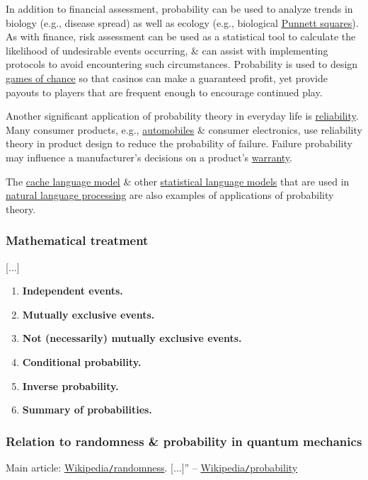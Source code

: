 \documentclass{article}
\begin{document}
In addition to financial assessment, probability can be used to analyze trends in biology (e.g., disease spread) as well as ecology (e.g., biological \href{https://en.wikipedia.org/wiki/Punnett_squares}{Punnett squares}). As with finance, risk assessment can be used as a statistical tool to calculate the likelihood of undesirable events occurring, \& can assist with implementing protocols to avoid encountering such circumstances. Probability is used to design \href{https://en.wikipedia.org/wiki/Games_of_chance}{games of chance} so that casinos can make a guaranteed profit, yet provide payouts to players that are frequent enough to encourage continued play.

Another significant application of probability theory in everyday life is \href{https://en.wikipedia.org/wiki/Reliability_(statistics)}{reliability}. Many consumer products, e.g., \href{https://en.wikipedia.org/wiki/Automobiles}{automobiles} \& consumer electronics, use reliability theory in product design to reduce the probability of failure. Failure probability may influence a manufacturer's decisions on a product's \href{https://en.wikipedia.org/wiki/Warranty}{warranty}.

The \href{https://en.wikipedia.org/wiki/Cache_language_model}{cache language model} \& other \href{https://en.wikipedia.org/wiki/Statistical_Language_Model}{statistical language models} that are used in \href{https://en.wikipedia.org/wiki/Natural_language_processing}{natural language processing} are also examples of applications of probability theory.

\subsubsection{Mathematical treatment}
[$\ldots$]
\begin{enumerate}
	\item {\bf Independent events.}
	\item {\bf Mutually exclusive events.}
	\item {\bf Not (necessarily) mutually exclusive events.}
	\item {\bf Conditional probability.}
	\item {\bf Inverse probability.}
	\item {\bf Summary of probabilities.}
\end{enumerate}

\subsubsection{Relation to randomness \& probability in quantum mechanics}
Main article: \href{https://en.wikipedia.org/wiki/Randomness}{Wikipedia{\tt/}randomness}. [$\ldots$]'' -- \href{https://en.wikipedia.org/wiki/Probability}{Wikipedia{\tt/}probability}
\end{document}
